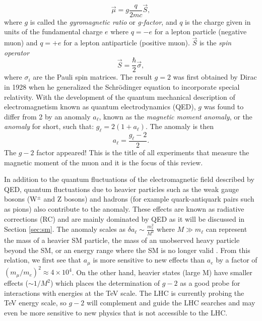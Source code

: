 \documentclass{outhesis}
\begin{document}
\begin{equation}
\overrightarrow{\mu} = g\frac{q}{2mc}\overrightarrow{S},
\label{eq:mu}
\end{equation}
where $g$ is called the \emph{gyromagnetic ratio} or \emph{g-factor}, and $q$ is the charge given in units of the fundamental charge $e$ where $q = -e$ for a lepton particle (negative muon) and $q = +e$ for a lepton antiparticle (positive muon). $\overrightarrow{S}$ is the \emph{spin operator}
\begin{equation}
\overrightarrow{S} = \frac{\hbar}{2}\overrightarrow{\sigma},
\end{equation} 
where $\sigma_i$ are the Pauli spin matrices. 
The result $g = 2$ was first obtained by Dirac in 1928 when he generalized the Schr\"{o}dinger equation to incorporate special relativity. With the development of the quantum mechanical description of electromagnetism known as quantum electrodynamics (QED), $g$ was found to differ from 2 by an anomaly $a_\ell$, known as the  \emph{magnetic moment anomaly}, or the \emph{anomaly} for short, such that: $g_\ell = 2(1+a_\ell)$. The anomaly is then
\begin{equation}
a_{\ell} = \frac{g_\ell-2}{2}.
\end{equation}
The $g-2$ factor appeared! This is the title of all experiments that measure the magnetic moment of the muon and it is the focus of this review.

In addition to the quantum fluctuations of the electromagnetic field described by QED, quantum fluctuations due to heavier particles such as the weak gauge bosons (W$^{\pm}$ and Z bosons) and hadrons (for example quark-antiquark pairs such as pions) also contribute to the anomaly. These effects are known as radiative corrections (RC) and are mainly dominated by QED as it will be discussed in Section \ref{sec:sm}. The anomaly scales as $\delta a_\ell \sim \frac{m_\ell^2}{M^2}$  where $M\gg m_\ell$ can represent the mass of a heavier SM particle, the mass of an unobserved heavy particle beyond the SM, or an energy range where the SM is no longer valid \cite{phen}. From this relation, we first see that $a_{\mu}$ is more sensitive to new effects than $a_e$ by a factor of $\left(m_{\mu}/m_e\right)^2 \approx 4 \times 10^4$. On the other hand, heavier states (large M) have smaller effects ($\sim 1/M^2$) which places the determination of $g-2$ as a good probe for interactions with energies at the TeV scale. The LHC is currently probing the TeV energy scale, so $g-2$ will complement and guide the LHC searches and may even be more sensitive to new physics that is not accessible to the LHC. 
\end{document}
